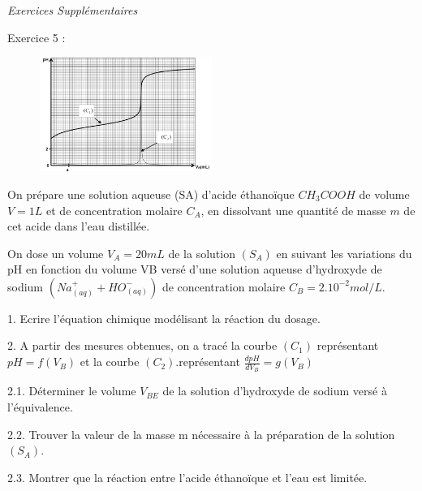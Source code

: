 \documentclass[12pt, french]{article}
\begin{document}
\vspace{-0.8cm}
\begin{center}
   \Large{ \em{Exercices Supplémentaires}}
\end{center}


\vspace{-0.6cm}
\begin{Box2}{Exercice 5 : }
	\begin{figure}
  \begin{center}
	  \vspace{-0.6cm}
	\includegraphics[width=0.5\textwidth]{./img/Dosage_03.png}
  \end{center}
\end{figure}
On prépare une solution aqueuse
(SA) d’acide éthanoïque $CH_3COOH$ de
volume $V = 1L$ et de concentration
molaire $C_A$, en dissolvant une quantité
de masse $m$ de cet acide dans l’eau distillée.

On dose un volume $V_A = 20mL$ de
la solution $(S_A)$ en suivant les
variations du pH en fonction du
volume VB versé d’une solution
aqueuse d’hydroxyde de sodium $(Na^+_{(aq)} +  HO^-_{(aq)})$ de concentration molaire $C_B = 2.10^{-2}mol/L$.

1. Ecrire l’équation chimique modélisant la réaction du dosage.

2. A partir des mesures obtenues, on a tracé la courbe $(C_1)$ représentant $pH = f(V_B)$ et la courbe $(C_2)$.représentant $\frac{dpH}{dV_B} = g(V_B)$

2.1. Déterminer le volume $V_{BE}$ de la solution d’hydroxyde de sodium versé à l’équivalence.

2.2. Trouver la valeur de la masse m nécessaire à la préparation de la solution $(S_A)$.

2.3. Montrer que la réaction entre l’acide éthanoïque et l’eau est limitée.

\end{Box2}


	










\end{document}
